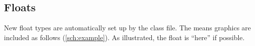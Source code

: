 \documentclass[12pt]{article}
\begin{document}
\subsection{Floats}

New float types are automatically set up by the class file.  The
means graphics are included as follows (\ref{sch:example}).  As
illustrated, the float is ``here'' if possible.














\end{document}
